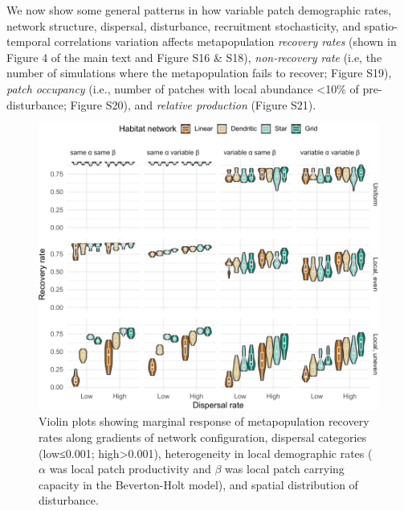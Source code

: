 \documentclass[
]{article}
\begin{document}
We now show some general patterns in how variable patch demographic
rates, network structure, dispersal, disturbance, recruitment
stochasticity, and spatio-temporal correlations variation affects
metapopulation \emph{recovery rates} (shown in Figure 4 of the main text
and Figure S16 \& S18), \emph{non-recovery rate} (i.e, the number of
simulations where the metapopulation fails to recover; Figure S19),
\emph{patch occupancy} (i.e., number of patches with local abundance
\textless10\% of pre-disturbance; Figure S20), and \emph{relative
production} (Figure S21).

\begin{figure}[H]

{\centering \includegraphics{Managing_for_ecological_surprises_in_metapopulations_files/figure-latex/violin plots of risk of recovery rates based on variable patch demographic rates-1} 

}

\caption{Violin plots showing marginal response of metapopulation recovery rates along gradients of network configuration, dispersal categories (low≤0.001; high>0.001), heterogeneity in local demographic rates ($\alpha$ was local patch productivity and $\beta$ was local patch carrying capacity in the Beverton-Holt model), and spatial distribution of disturbance.}\label{fig:violin plots of risk of recovery rates based on variable patch demographic rates}
\end{figure}
\end{document}
